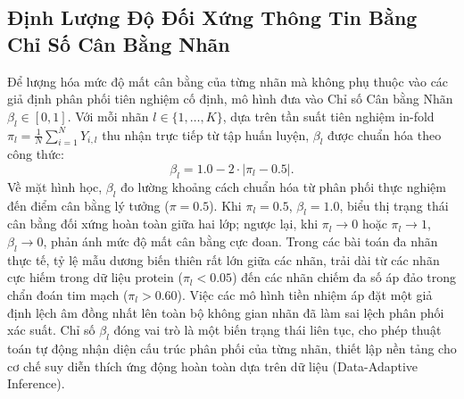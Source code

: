 \documentclass[10pt,a4paper,twoside]{article}
\begin{document}
\subsection{Định Lượng Độ Đối Xứng Thông Tin Bằng Chỉ Số Cân Bằng Nhãn}
Để lượng hóa mức độ mất cân bằng của từng nhãn mà không phụ thuộc vào các giả định phân phối tiên nghiệm cố định, mô hình đưa vào Chỉ số Cân bằng Nhãn $\beta_l \in [0, 1]$. Với mỗi nhãn $l \in \{1, \dots, K\}$, dựa trên tần suất tiên nghiệm in-fold $\pi_l = \frac{1}{N}\sum_{i=1}^N Y_{i, l}$ thu nhận trực tiếp từ tập huấn luyện, $\beta_l$ được chuẩn hóa theo công thức:
\begin{equation}
\beta_l = 1.0 - 2 \cdot |\pi_l - 0.5|.
\end{equation}
Về mặt hình học, $\beta_l$ đo lường khoảng cách chuẩn hóa từ phân phối thực nghiệm đến điểm cân bằng lý tưởng ($\pi = 0.5$). Khi $\pi_l = 0.5$, $\beta_l = 1.0$, biểu thị trạng thái cân bằng đối xứng hoàn toàn giữa hai lớp; ngược lại, khi $\pi_l \to 0$ hoặc $\pi_l \to 1$, $\beta_l \to 0$, phản ánh mức độ mất cân bằng cực đoan. Trong các bài toán đa nhãn thực tế, tỷ lệ mẫu dương biến thiên rất lớn giữa các nhãn, trải dài từ các nhãn cực hiếm trong dữ liệu protein ($\pi_l < 0.05$) đến các nhãn chiếm đa số áp đảo trong chẩn đoán tim mạch ($\pi_l > 0.60$). Việc các mô hình tiền nhiệm áp đặt một giả định lệch âm đồng nhất lên toàn bộ không gian nhãn đã làm sai lệch phân phối xác suất. Chỉ số $\beta_l$ đóng vai trò là một biến trạng thái liên tục, cho phép thuật toán tự động nhận diện cấu trúc phân phối của từng nhãn, thiết lập nền tảng cho cơ chế suy diễn thích ứng động hoàn toàn dựa trên dữ liệu (Data-Adaptive Inference).
\end{document}
